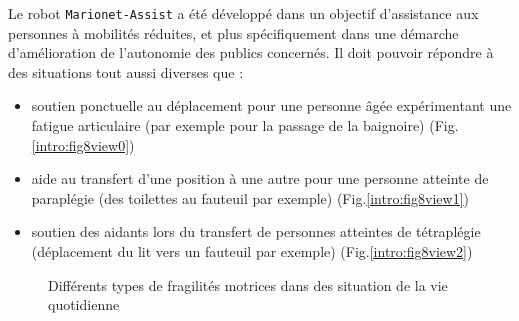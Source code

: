 Le robot {\tt Marionet-Assist} a été développé dans un objectif d'assistance aux 
personnes à mobilités réduites, et plus spécifiquement dans une démarche 
d'amélio\-ration de l'autonomie des publics concernés. Il doit pouvoir répondre 
à des situations tout aussi diverses que :
\begin{itemize}
 \item soutien ponctuelle au déplacement pour une personne âgée expérimentant 
une fatigue articulaire (par exemple pour la passage de la baignoire) 
(Fig.\ref{intro:fig8view0})
 \item aide au transfert d'une position à une autre pour une personne atteinte 
de paraplégie (des toilettes au fauteuil par exemple) 
(Fig.\ref{intro:fig8view1})
 \item soutien des aidants lors du transfert de personnes atteintes de 
tétraplégie (déplacement du lit vers un fauteuil par exemple) 
(Fig.\ref{intro:fig8view2})
\end{itemize}

\begin{figure}[htp]
  \centering
   \hfill
   \hfill
   \hfill
    \caption{\footnotesize{Différents types de fragilités motrices dans des 
situation de la vie quotidienne}}
\label{intro:fig8}
\end{figure}

